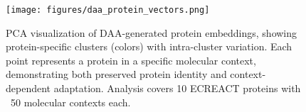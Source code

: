 \begin{figure}[h]
    \centering
    \texttt{[image: figures/daa\_protein\_vectors.png]}
    \caption{PCA visualization of DAA-generated protein embeddings, showing protein-specific clusters (colors) with intra-cluster variation. Each point represents a protein in a specific molecular context, demonstrating both preserved protein identity and context-dependent adaptation. Analysis covers 10 ECREACT proteins with ~50 molecular contexts each.}
    \label{fig:protein_embeddings}
\end{figure}
